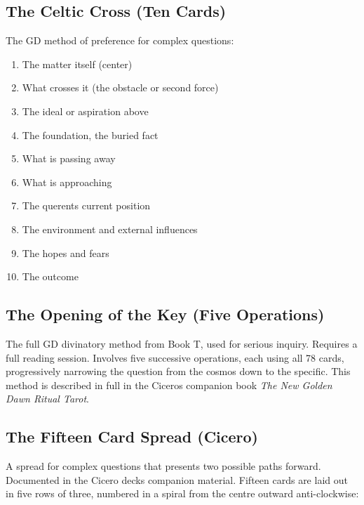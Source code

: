 \subsection{The Celtic Cross (Ten Cards)}\label{the-celtic-cross-ten-cards}

The GD method of preference for complex questions:

\begin{enumerate}
\def\labelenumi{\arabic{enumi}.}
\tightlist
\item
  The matter itself (center)
\item
  What crosses it (the obstacle or second force)
\item
  The ideal or aspiration above
\item
  The foundation, the buried fact
\item
  What is passing away
\item
  What is approaching
\item
  The querent\textquotesingle s current position
\item
  The environment and external influences
\item
  The hopes and fears
\item
  The outcome
\end{enumerate}

\subsection{The Opening of the Key (Five Operations)}\label{the-opening-of-the-key-five-operations}

The full GD divinatory method from Book T, used for serious inquiry. Requires a full reading session. Involves five successive operations, each using all 78 cards, progressively narrowing the question from the cosmos down to the specific. This method is described in full in the Cicero\textquotesingle s companion book \emph{The New Golden Dawn Ritual Tarot}.

\subsection{The Fifteen Card Spread (Cicero)}\label{the-fifteen-card-spread}

A spread for complex questions that presents two possible paths forward. Documented in the Cicero deck\textquotesingle s companion material. Fifteen cards are laid out in five rows of three, numbered in a spiral from the centre outward anti-clockwise:


